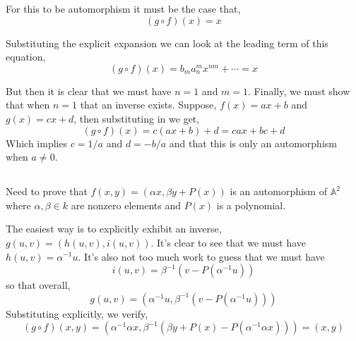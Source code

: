\documentclass{article}
\begin{document}
For this to be automorphism it must be the case that,
\begin{equation}
(g \circ f)(x) = x
\end{equation}

Substituting the explicit expansion we can look at the leading term of this equation,
\begin{equation}
(g \circ f)(x) = b_{m}a_{n}^{m}x^{nm} + \cdots = x
\end{equation}

But then it is clear that we must have \(n=1\) and \(m=1\). Finally, we must show that when \(n=1\) that an inverse exists. Suppose, \(f(x) = ax + b\) and \(g(x) = cx + d\), then substituting in we get,
\begin{equation}
(g \circ f)(x) = c(ax + b) + d = cax + bc + d
\end{equation}
Which implies \(c = 1/a\) and \(d = -b/a\) and that this is only an automorphism when \(a \neq 0\).

\subsection{}
Need to prove that \(f(x, y) = (\alpha x, \beta y + P(x))\) is an automorphism of \(\mathbb{A}^{2}\) where \(\alpha, \beta \in k\) are nonzero elements and \(P(x)\) is a polynomial.

The easiest way is to explicitly exhibit an inverse, \(g(u, v) = (h(u, v), i(u, v))\). It's clear to see that we must have \(h(u, v) = \alpha^{-1}u\). It's also not too much work to guess that we must have
\begin{equation}
i(u, v) = \beta^{-1}(v - P(\alpha^{-1}u))
\end{equation}
so that overall,
\begin{equation}
g(u, v) = (\alpha^{-1}u, \beta^{-1}(v - P(\alpha^{-1}u)))
\end{equation}
Substituting explicitly, we verify,
\begin{equation}
(g\circ f)(x, y) = (\alpha^{-1}\alpha x, \beta^{-1}(\beta y + P(x) - P(\alpha^{-1}\alpha x))) = (x, y)
\end{equation}
\end{document}
